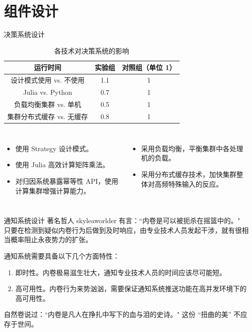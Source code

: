 \section{组件设计}
    \begin{frame}{决策系统设计}
        \begin{table}[]
            \centering
            \begin{tabular}{c|c|c}
            \textbf{运行时间} & \textbf{实验组} & \textbf{对照组（单位 1）} \\
            \hline
                设计模式使用 vs. 不使用 & 1.1 & 1 \\
                Julia vs. Python & 0.7 & 1 \\
                负载均衡集群 vs. 单机 & 0.5 & 1 \\
                集群分布式缓存 vs. 无缓存 & 0.8 & 1 \\
            \end{tabular}
            \caption{各技术对决策系统的影响}
            \label{tab:tech-strategy}
        \end{table}

        \begin{columns}
            \small
            \begin{itemize}
                \item 使用 Strategy 设计模式。
                \item 使用 Julia 高效计算矩阵乘法。
                \item 对归因系统暴露幂等性 API，使用计算集群增强计算能力。
            \end{itemize}

            \begin{itemize}
                \item 采用负载均衡，平衡集群中各处理机的负载。
                \item 采用分布式缓存技术，加快集群整体对高频特殊输入的反应。
            \end{itemize}
        \end{columns}
    \end{frame}

    \begin{frame}{通知系统设计}
        著名哲人 skyleaworlder 有言：“内卷是可以被扼杀在摇篮中的。"\cite{involution} 只要在检测到疑似内卷行为后做到及时响应，由专业技术人员发起干涉，就有很相当概率阻止永夜势力的扩张。

        通知系统需要具备以下几个方面特性：
        \begin{enumerate}
            \item 即时性。内卷极易滋生壮大，通知专业技术人员的时间应该尽可能短。
            \item 高可用性。内卷行为来势汹汹，需要保证通知系统推送功能在高并发环境下的高可用性。
        \end{enumerate}

        自然卷说过：“内卷是凡人在挣扎中写下的血与泪的史诗。"\cite{undergrads_inv} 这份 “扭曲的美” 不应存于世间。
    \end{frame}
